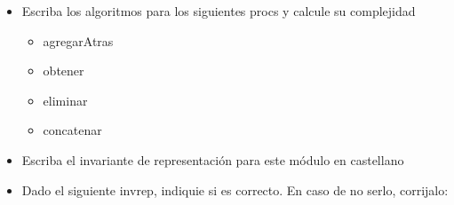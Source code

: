 \begin{itemize}
	\item Escriba los algoritmos para los siguientes procs y calcule su complejidad
	      \begin{itemize}
		      \item agregarAtras
		      \item obtener
		      \item eliminar
		      \item concatenar
	      \end{itemize}
	\item Escriba el invariante de representación para este módulo en castellano
	\item Dado el siguiente invrep, indiquie si es correcto. En caso de no serlo, corrijalo:




\end{itemize}

